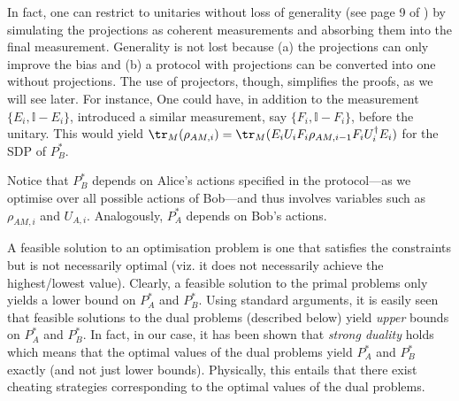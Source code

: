 \documentclass{article}
\begin{document}
\begin{remark}
  In fact, one can restrict to unitaries without loss of generality
  (see page 9 of \cite{Mochon07}) by simulating the projections as
  coherent measurements and absorbing them into the final measurement.
  Generality is not
  lost because (a) the projections can only improve the bias
  and (b) a protocol with projections can be converted into one without projections. The use of projectors, though, simplifies the proofs, as we will see later.
  For instance,
  One could have, in addition to the measurement $\{E_{i},\mathbb{I}-E_{i}\}$,
  introduced a similar measurement, say $\{F_{i},\mathbb{I}-F_{i}\}$,
  before the unitary. This would yield $\tr_{M}(\rho_{AM,i})=\tr_{M}(E_{i}U_{i}F_{i}\rho_{AM,i-1}F_{i}U_{i}^{\dagger}E_{i})$
  for the SDP of $P_{B}^{*}$. %
  \label{rem:projBeforeAndAfter}
\end{remark}


Notice that $P_{B}^{*}$ depends on Alice's actions
specified in the protocol---as we optimise
over all possible actions of Bob---and thus involves variables such
as $\rho_{AM,i}$ and $U_{A,i}$. Analogously, $P_{A}^{*}$ depends
on Bob's actions.

A feasible solution to an optimisation problem is one that satisfies the constraints but is not necessarily optimal (viz. it does not necessarily achieve the highest/lowest value). Clearly, a feasible solution to the primal problems only yields a lower bound on $P_A^*$ and $P_B^*$. Using standard arguments, it is easily seen that feasible solutions to the dual problems (described below) yield \emph{upper} bounds on $P_A^*$ and $P_B^*$. In fact, in our case, it has been shown that \emph{strong duality} holds which means that the optimal values of the dual problems yield $P_A^*$ and $P_B^*$ exactly (and not just lower bounds). Physically, this entails that there exist cheating strategies corresponding to the optimal values of the dual problems.

%
%
%
%
%
%
%
%
%
%
\end{document}
